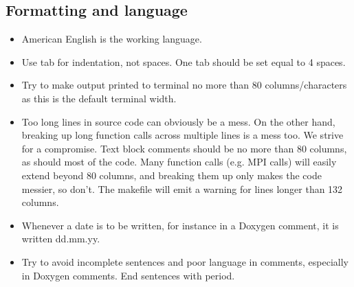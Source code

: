 \documentclass[10pt,a4paper]{article}
\begin{document}
\subsection{Formatting and language}

\begin{itemize}
	\item American English is the working language.
	\item Use tab for indentation, not spaces. One tab should be set equal to 4 spaces.
	\item Try to make output printed to terminal no more than 80 columns/characters as this is the default terminal width.
	\item Too long lines in source code can obviously be a mess. On the other hand, breaking up long function calls across multiple lines
	is a mess too. We strive for a compromise. Text block comments should be no more than 80 columns, as should most of the code. Many
	function calls (e.g. MPI calls) will easily extend beyond 80 columns, and breaking them up only makes the code messier, so don't. The
	makefile will emit a warning for lines longer than 132 columns.
	\item Whenever a date is to be written, for instance in a Doxygen comment, it is written dd.mm.yy.
	\item Try to avoid incomplete sentences and poor language in comments, especially in Doxygen comments. End sentences with period.
\end{itemize}
\end{document}
